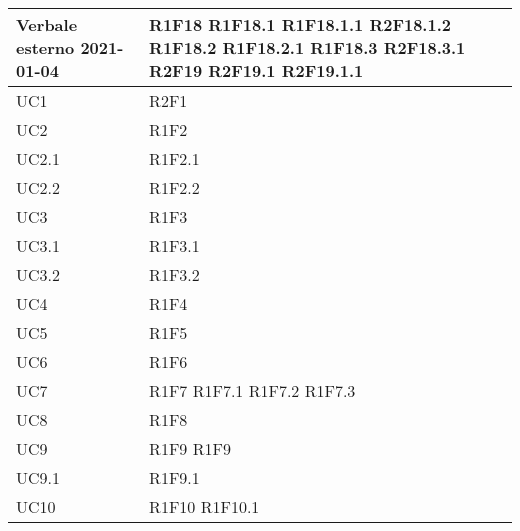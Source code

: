 \begin{center}
\begin{longtable}{|p{44mm}|p{22mm}|}
\hline
Verbale esterno 2021-01-04 &
R1F18 \newline
R1F18.1 \newline
R1F18.1.1 \newline
R2F18.1.2 \newline
R1F18.2 \newline
R1F18.2.1 \newline
R1F18.3 \newline
R2F18.3.1 \newline
R2F19 \newline
R2F19.1 \newline
R2F19.1.1 \newline
\\
\hline
UC1 &
R2F1 \newline
\\
\hline
UC2 &
R1F2 \newline
\\
\hline
UC2.1 &
R1F2.1 \newline
\\
\hline
UC2.2 &
R1F2.2 \newline
\\
\hline
UC3 &
R1F3 \newline
\\
\hline
UC3.1 &
R1F3.1 \newline
\\
\hline
UC3.2 &
R1F3.2 \newline
\\
\hline
UC4 &
R1F4 \newline
\\
\hline
UC5 &
R1F5 \newline
\\
\hline
UC6 &
R1F6 \newline
\\
\hline
UC7 &
R1F7 \newline
R1F7.1 \newline
R1F7.2 \newline
R1F7.3 \newline
\\
\hline
UC8 &
R1F8 \newline
\\
\hline
UC9 &
R1F9 \newline
R1F9 \newline
\\
\hline
UC9.1 &
R1F9.1 \newline
\\
\hline
UC10 &
R1F10 \newline
R1F10.1 \newline

\end{longtable}
\end{center}

